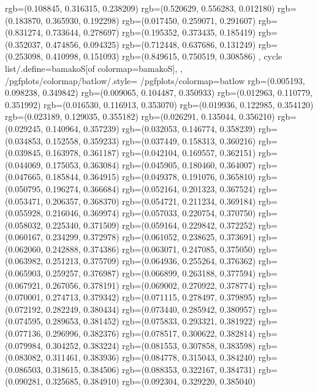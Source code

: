 {{{					rgb=(0.108845, 0.316315, 0.238209)
					rgb=(0.520629, 0.556283, 0.012180)
					rgb=(0.183870, 0.365930, 0.192298)
					rgb=(0.017450, 0.259071, 0.291607)
					rgb=(0.831274, 0.733644, 0.278697)
					rgb=(0.195352, 0.373435, 0.185419)
					rgb=(0.352037, 0.474856, 0.094325)
					rgb=(0.712448, 0.637686, 0.131249)
					rgb=(0.253098, 0.410998, 0.151093)
					rgb=(0.849615, 0.750519, 0.308586)
			},
		cycle list/.define={bamakoS}{[of colormap=bamakoS]},
		},
		/pgfplots/colormap/batlow/.style={
			/pgfplots/colormap={batlow}{%
					rgb=(0.005193, 0.098238, 0.349842)
					rgb=(0.009065, 0.104487, 0.350933)
					rgb=(0.012963, 0.110779, 0.351992)
					rgb=(0.016530, 0.116913, 0.353070)
					rgb=(0.019936, 0.122985, 0.354120)
					rgb=(0.023189, 0.129035, 0.355182)
					rgb=(0.026291, 0.135044, 0.356210)
					rgb=(0.029245, 0.140964, 0.357239)
					rgb=(0.032053, 0.146774, 0.358239)
					rgb=(0.034853, 0.152558, 0.359233)
					rgb=(0.037449, 0.158313, 0.360216)
					rgb=(0.039845, 0.163978, 0.361187)
					rgb=(0.042104, 0.169557, 0.362151)
					rgb=(0.044069, 0.175053, 0.363084)
					rgb=(0.045905, 0.180460, 0.364007)
					rgb=(0.047665, 0.185844, 0.364915)
					rgb=(0.049378, 0.191076, 0.365810)
					rgb=(0.050795, 0.196274, 0.366684)
					rgb=(0.052164, 0.201323, 0.367524)
					rgb=(0.053471, 0.206357, 0.368370)
					rgb=(0.054721, 0.211234, 0.369184)
					rgb=(0.055928, 0.216046, 0.369974)
					rgb=(0.057033, 0.220754, 0.370750)
					rgb=(0.058032, 0.225340, 0.371509)
					rgb=(0.059164, 0.229842, 0.372252)
					rgb=(0.060167, 0.234299, 0.372978)
					rgb=(0.061052, 0.238625, 0.373691)
					rgb=(0.062060, 0.242888, 0.374386)
					rgb=(0.063071, 0.247085, 0.375050)
					rgb=(0.063982, 0.251213, 0.375709)
					rgb=(0.064936, 0.255264, 0.376362)
					rgb=(0.065903, 0.259257, 0.376987)
					rgb=(0.066899, 0.263188, 0.377594)
					rgb=(0.067921, 0.267056, 0.378191)
					rgb=(0.069002, 0.270922, 0.378774)
					rgb=(0.070001, 0.274713, 0.379342)
					rgb=(0.071115, 0.278497, 0.379895)
					rgb=(0.072192, 0.282249, 0.380434)
					rgb=(0.073440, 0.285942, 0.380957)
					rgb=(0.074595, 0.289653, 0.381452)
					rgb=(0.075833, 0.293321, 0.381922)
					rgb=(0.077136, 0.296996, 0.382376)
					rgb=(0.078517, 0.300622, 0.382814)
					rgb=(0.079984, 0.304252, 0.383224)
					rgb=(0.081553, 0.307858, 0.383598)
					rgb=(0.083082, 0.311461, 0.383936)
					rgb=(0.084778, 0.315043, 0.384240)
					rgb=(0.086503, 0.318615, 0.384506)
					rgb=(0.088353, 0.322167, 0.384731)
					rgb=(0.090281, 0.325685, 0.384910)
					rgb=(0.092304, 0.329220, 0.385040)
}}}
